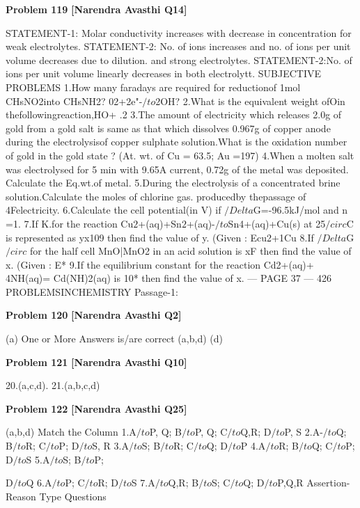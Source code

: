 \begin{problembox}
\textbf{Problem 119} \hfill \textbf{[Narendra Avasthi Q14]}
\label{q:ext-narendra_avasthi_all_questions-119}

STATEMENT-1: Molar conductivity increases with decrease in concentration for weak
electrolytes.
STATEMENT-2: No. of ions increases and no. of ions per unit volume decreases due to
dilution.
and strong electrolytes.
STATEMENT-2:No. of ions per unit volume linearly decreases in both electrolytt.
SUBJECTIVE PROBLEMS
1.How many faradays are required for reductionof 1mol CHsNO2into CHsNH2?
02+2e"-$/to$2OH?
2.What is the equivalent weight ofOin thefollowingreaction,HO+
.2
3.The amount of electricity which releases 2.0g of gold from a gold salt is same as that which
dissolves 0.967g of copper anode during the electrolysisof copper sulphate solution.What is
the oxidation number of gold in the gold state ? (At. wt. of Cu = 63.5; Au =197)
4.When a molten salt was electrolysed for 5 min with 9.65A current, 0.72g of the metal was
deposited.
Calculate the Eq.wt.of metal.
5.During the electrolysis of a concentrated brine solution.Calculate the moles of chlorine gas.
producedby thepassage of 4Felectricity.
6.Calculate the cell potential(in V) if $/Delta$G=-96.5kJ/mol and n =1.
7.If K.for the reaction
Cu$2$+(aq)+Sn$2$+(aq)-$/to$Sn4+(aq)+Cu(s)
at 25$/circ$C is represented as yx109 then find the value of y.
(Given : Ecu2+1Cu
8.If $/Delta$G$/circ$ for the half cell MnO|MnO2 in an acid solution is xF then find the value of x.
(Given : E*
9.If the equilibrium constant for the reaction Cd2+(aq)+ 4NH(aq)= Cd(NH)2(aq) is 10*
then find the value of x.
--- PAGE 37 ---
426
PROBLEMSINCHEMISTRY
Passage-1:
\end{problembox}

\begin{problembox}
\textbf{Problem 120} \hfill \textbf{[Narendra Avasthi Q2]}
\label{q:ext-narendra_avasthi_all_questions-120}

(a)
One or More Answers is/are correct
(a,b,d)
(d)
\end{problembox}

\begin{problembox}
\textbf{Problem 121} \hfill \textbf{[Narendra Avasthi Q10]}
\label{q:ext-narendra_avasthi_all_questions-121}

20.(a,c,d).
21.(a,b,c,d)
\end{problembox}

\begin{problembox}
\textbf{Problem 122} \hfill \textbf{[Narendra Avasthi Q25]}
\label{q:ext-narendra_avasthi_all_questions-122}

(a,b,d)
Match the Column
1.A$/to$P, Q;
B$/to$P, Q;
C$/to$Q,R;
D$/to$P, S
2.A-$/to$Q;
B$/to$R;
C$/to$P;
D$/to$S, R
3.A$/to$S;
B$/to$R;
C$/to$Q;
D$/to$P
4.A$/to$R;
B$/to$Q;
C$/to$P;
D$/to$S
5.A$/to$S;
B$/to$P;
 
D$/to$Q
6.A$/to$P;
C$/to$R;
D$/to$S
7.A$/to$Q,R;
B$/to$S;
C$/to$Q;
D$/to$P,Q,R
Assertion-Reason Type Questions
\end{problembox}

